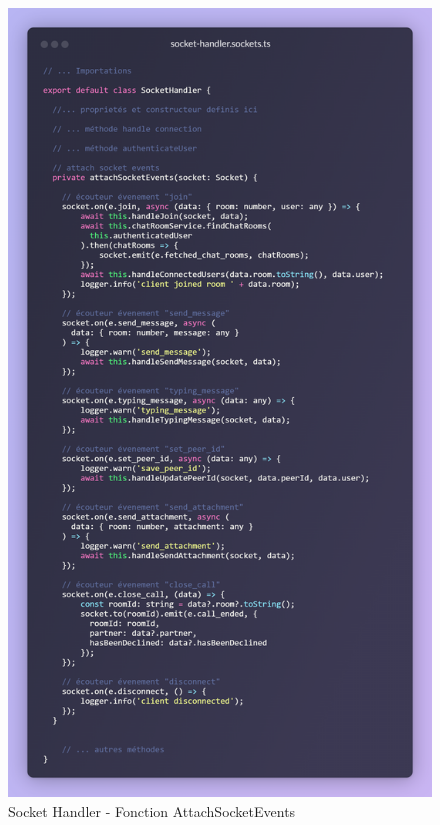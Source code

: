 \vspace{1cm}

\begin{figure}[H]
    \centering
    \includegraphics[width=13cm]{assets/annexes/snippet (7).png}
    \caption{Socket Handler - Fonction AttachSocketEvents}
\end{figure}

\vspace{1cm}

